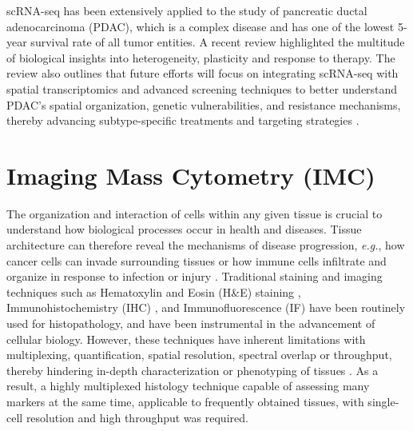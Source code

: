 scRNA-seq has been extensively applied to the study of pancreatic ductal adenocarcinoma (PDAC), which is a complex disease and has one of the lowest 5-year survival rate of all tumor entities. A recent review highlighted the multitude of biological insights into heterogeneity, plasticity and response to therapy. The review also outlines that future efforts will focus on integrating scRNA-seq with spatial transcriptomics and advanced screening techniques to better understand PDAC's spatial organization, genetic vulnerabilities, and resistance mechanisms, thereby advancing subtype-specific treatments and targeting strategies \textbf{\cite{barthel_single-cell_2023}}.





\section{Imaging Mass Cytometry (IMC)}  %
\label{sec:IMC}


The organization and interaction of cells within any given tissue is crucial to understand how biological processes occur in health and diseases. Tissue architecture can therefore reveal the mechanisms of disease progression, \textit{e.g.}, how cancer cells can invade surrounding tissues or how immune cells infiltrate and organize in response to infection or injury \textbf{\cite{veenstra_research_2021}}. Traditional staining and imaging techniques such as Hematoxylin and Eosin (H\&E) staining \textbf{\cite{noauthor_progress_nodate}}, Immunohistochemistry (IHC) \textbf{\cite{ortiz_hidalgo_immunohistochemistry_2022}}, and Immunofluorescence (IF) \textbf{\cite{odell_immunofluorescence_2013}} have been routinely used for histopathology, and have been instrumental in the advancement of cellular biology. However, these techniques have inherent limitations with multiplexing, quantification, spatial resolution, spectral overlap or throughput, thereby hindering in-depth characterization or phenotyping of tissues \textbf{\cite{veenstra_research_2021,leroux_imaging_2021}}. As a result, a highly multiplexed histology technique capable of assessing many markers at the same time, applicable to frequently obtained tissues, with single-cell resolution and high throughput was required.\\

